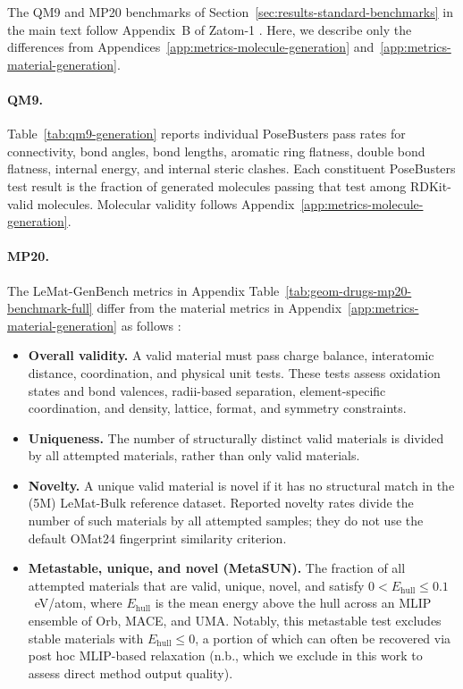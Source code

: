 \documentclass{article} %
\begin{document}
The QM9 and MP20 benchmarks of Section~\ref{sec:results-standard-benchmarks} in the main text follow Appendix~B of Zatom-1 \citep{morehead2026zatom1}. Here, we describe only the differences from Appendices~\ref{app:metrics-molecule-generation} and~\ref{app:metrics-material-generation}.

\paragraph{QM9.}
Table~\ref{tab:qm9-generation} reports individual PoseBusters pass rates for
connectivity, bond angles, bond lengths, aromatic ring flatness, double bond
flatness, internal energy, and internal steric clashes. Each constituent PoseBusters test result is the fraction of generated molecules passing that test among RDKit-valid molecules. Molecular validity follows Appendix~\ref{app:metrics-molecule-generation}.

\paragraph{MP20.}
The LeMat-GenBench metrics in
Appendix Table~\ref{tab:geom-drugs-mp20-benchmark-full} differ from the
material metrics in Appendix~\ref{app:metrics-material-generation} as follows
\citep{betala2025lematgenbench}:
\begin{itemize}
  \item \textbf{Overall validity.} A valid material must pass charge balance,
  interatomic distance, coordination, and physical unit tests. These tests assess oxidation states and bond valences, radii-based separation, element-specific coordination, and density, lattice, format, and symmetry constraints.
  \item \textbf{Uniqueness.} The number of structurally distinct valid
  materials is divided by all attempted materials, rather than only valid
  materials.
  \item \textbf{Novelty.} A unique valid material is novel if it has no
  structural match in the (5M) LeMat-Bulk reference dataset. Reported novelty rates divide the number of such materials by all attempted samples; they do
  not use the default OMat24 fingerprint similarity criterion.
  \item \textbf{Metastable, unique, and novel (MetaSUN).} The fraction of
  all attempted materials that are valid, unique, novel, and satisfy
  $0<E_{\mathrm{hull}}\leq0.1$~eV/atom, where $E_{\mathrm{hull}}$ is the mean
  energy above the hull across an MLIP ensemble of Orb, MACE, and UMA. Notably, this metastable test excludes stable materials with $E_{\mathrm{hull}}\leq0$, a portion of which can often be recovered via post hoc MLIP-based relaxation (n.b., which we exclude in this work to assess direct method output quality).
\end{itemize}
\end{document}
